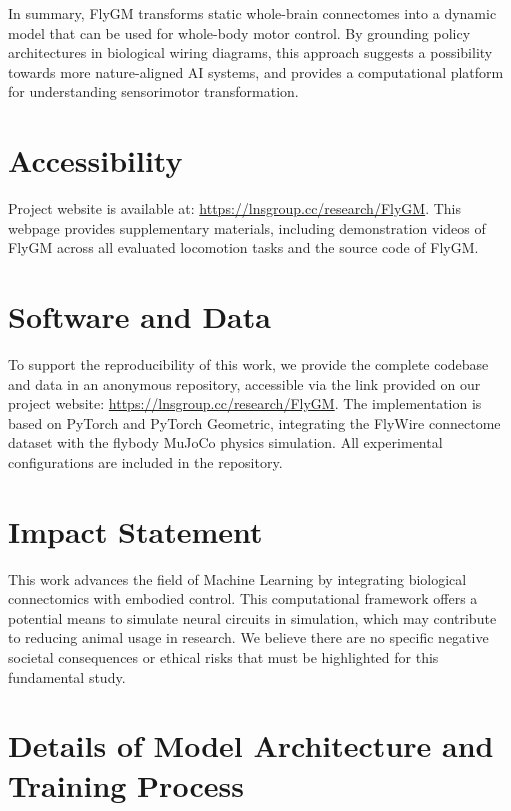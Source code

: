 \documentclass{article}
\theoremstyle{plain}
\theoremstyle{definition}
\theoremstyle{remark}
\begin{document}
In summary, FlyGM transforms static whole-brain connectomes into a dynamic model that can be used for whole-body motor control. By grounding policy architectures in biological wiring diagrams, this approach suggests a possibility towards more nature-aligned AI systems, and provides a computational platform for understanding sensorimotor transformation.

\newpage


\section*{Accessibility}

Project website is available at: \url{https://lnsgroup.cc/research/FlyGM}. This webpage provides supplementary materials, including demonstration videos of FlyGM across all evaluated locomotion tasks and the source code of FlyGM.

\section*{Software and Data}

To support the reproducibility of this work, we provide the complete codebase and data in an anonymous repository, accessible via the link provided on our project website: \url{https://lnsgroup.cc/research/FlyGM}. The implementation is based on PyTorch and PyTorch Geometric, integrating the FlyWire connectome dataset with the flybody MuJoCo physics simulation. All experimental configurations are included in the repository.

\section*{Impact Statement}

This work advances the field of Machine Learning by integrating biological connectomics with embodied control. This computational framework offers a potential means to simulate neural circuits in simulation, which may contribute to reducing animal usage in research. We believe there are no specific negative societal consequences or ethical risks that must be highlighted for this fundamental study.

\newpage



\newpage
\appendix
\onecolumn

\section{Details of Model Architecture and Training Process}
\label{app:train_details}
\end{document}
